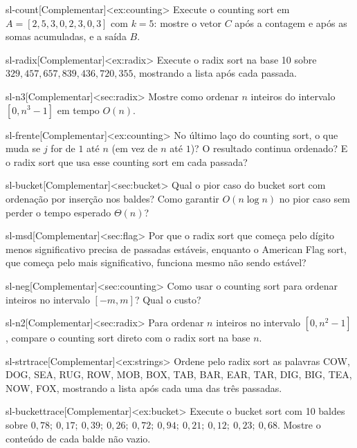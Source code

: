 \excompl
\begin{exercicio}{sl-count}[Complementar]<ex:counting>
Execute o counting sort em $A=[2,5,3,0,2,3,0,3]$ com $k=5$: mostre o vetor $C$ após a contagem e após as somas acumuladas, e a saída $B$.
\end{exercicio}
\begin{exercicio}{sl-radix}[Complementar]<ex:radix>
Execute o radix sort na base 10 sobre $329,457,657,839,436,720,355$, mostrando a lista após cada passada.
\end{exercicio}
\begin{exercicio}{sl-n3}[Complementar]<sec:radix>
Mostre como ordenar $n$ inteiros do intervalo $[0,n^3-1]$ em tempo $O(n)$.
\end{exercicio}
\begin{exercicio}{sl-frente}[Complementar]<ex:counting>
No último laço do counting sort, o que muda se $j$ for de $1$ até $n$ (em vez de $n$ até $1$)? O resultado continua ordenado? E o radix sort que usa esse counting sort em cada passada?
\end{exercicio}
\begin{exercicio}{sl-bucket}[Complementar]<sec:bucket>
Qual o pior caso do bucket sort com ordenação por inserção nos baldes? Como garantir $O(n\log n)$ no pior caso sem perder o tempo esperado $\Theta(n)$?
\end{exercicio}
\begin{exercicio}{sl-msd}[Complementar]<sec:flag>
Por que o radix sort que começa pelo dígito menos significativo precisa de passadas estáveis, enquanto o American Flag sort, que começa pelo mais significativo, funciona mesmo não sendo estável?
\end{exercicio}
\begin{exercicio}{sl-neg}[Complementar]<sec:counting>
Como usar o counting sort para ordenar inteiros no intervalo $[-m,m]$? Qual o custo?
\end{exercicio}
\begin{exercicio}{sl-n2}[Complementar]<sec:radix>
Para ordenar $n$ inteiros no intervalo $[0,n^2-1]$, compare o counting sort direto com o radix sort na base $n$.
\end{exercicio}
\begin{exercicio}{sl-strtrace}[Complementar]<ex:strings>
Ordene pelo radix sort as palavras COW, DOG, SEA, RUG, ROW, MOB, BOX, TAB, BAR, EAR, TAR, DIG, BIG, TEA, NOW, FOX, mostrando a lista após cada uma das três passadas.
\end{exercicio}
\begin{exercicio}{sl-buckettrace}[Complementar]<ex:bucket>
Execute o bucket sort com 10 baldes sobre $0{,}78;\ 0{,}17;\ 0{,}39;\ 0{,}26;\ 0{,}72;\ 0{,}94;\ 0{,}21;\ 0{,}12;\ 0{,}23;\ 0{,}68$. Mostre o conteúdo de cada balde não vazio.
\end{exercicio}
